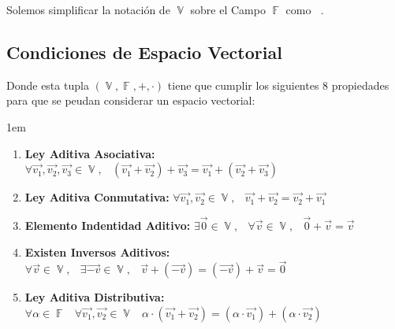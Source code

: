\documentclass[12pt, fleqn]{report}                             %
\newenvironment{SmallIndentation}[1][0.75em]                    %
        {\begin{adjustwidth}{#1}{}\begin{footnotesize}}             %
        {\end{footnotesize}\end{adjustwidth}}                       %
\DeclareMathOperator \Space     {\quad}                         %
\DeclareMathOperator \MiniSpace {\;}                            %
\theoremstyle{break}                                            %
\DeclareMathOperator \GenericField {\mathbb{F}}                 %
\DeclareMathOperator \VectorSet    {\mathbb{V}}                 %
\DeclareMathOperator \VectorSpace  {\VectorSet_{\GenericField}} %
\begin{document}
            Solemos simplificar la notación de $\VectorSet$ sobre el Campo $\GenericField$ como $\VectorSpace$.


            \subsection{Condiciones de Espacio Vectorial}

                Donde esta tupla $(\VectorSet, \GenericField, +, \cdot)$ tiene que cumplir los siguientes 8
                propiedades para que se peudan considerar un espacio vectorial:

                \begin{SmallIndentation}[1em]

                    \begin{enumerate}
                    
                        \item 
                            \textbf{Ley Aditiva Asociativa:}
                            $\forall \vec{v_1}, \vec{v_2}, \vec{v_3} \in \VectorSet, \MiniSpace
                                (\vec{v_1} + \vec{v_2}) + \vec{v_3} = \vec{v_1} + (\vec{v_2} + \vec{v_3})$

                        \item 
                            \textbf{Ley Aditiva Conmutativa:}
                            $\forall \vec{v_1}, \vec{v_2} \in \VectorSet, \MiniSpace
                                    \vec{v_1} + \vec{v_2} = \vec{v_2} + \vec{v_1}$

                        \item 
                            \textbf{Elemento Indentidad Aditivo:}
                            $\exists \vec{0} \in \VectorSet, \MiniSpace
                                \forall \vec{v} \in \VectorSet, \MiniSpace \vec{0} + \vec{v} = \vec{v}$

                        \item 
                            \textbf{Existen Inversos Aditivos:}
                            $\forall \vec{v} \in \VectorSet, \MiniSpace
                                    \exists \vec{-v} \in \VectorSet, \MiniSpace
                                        \vec{v} + (\vec{-v}) = (\vec{-v}) + \vec{v} = \vec{0}$

                        \item 
                            \textbf{Ley Aditiva Distributiva:}
                            $\forall \alpha \in \GenericField \MiniSpace
                                \forall \vec{v_1}, \vec{v_2} \in \VectorSet \MiniSpace
                                    \alpha \cdot (\vec{v_1} + \vec{v_2}) = 
                                        (\alpha \cdot \vec{v_1}) + (\alpha \cdot \vec{v_2})$


\end{enumerate}
\end{SmallIndentation}
\end{document}
